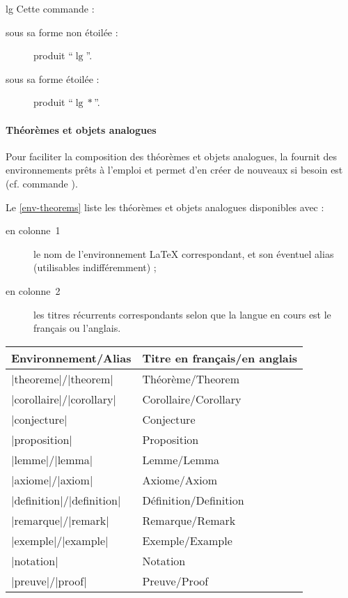 \begin{docCommand}{lg}{}
  Cette commande :
  \begin{description}
  \item[sous sa forme non étoilée :] produit \enquote{$\lg$}.
  \item[sous sa forme étoilée :] produit \enquote{$\lg*$}.
  \end{description}
\end{docCommand}

\paragraph{Théorèmes et objets analogues}

Pour faciliter la composition des théorèmes et objets analogues, la
\gztauthorcl{} fournit des environnements prêts à l'emploi et permet d'en créer
de nouveaux si besoin est (cf. commande ).

Le \vref{env-theorems} liste les théorèmes et objets analogues disponibles
%
avec :
\begin{description}
\item[en colonne~1] le nom de l'environnement \LaTeX{} correspondant, et son
  éventuel alias (utilisables indifféremment) ;
\item[en colonne~2] les titres récurrents correspondants selon que la langue en
  cours est le français ou l'anglais.
\end{description}

\begin{gzttable}[label=env-theorems,title=Environnements de type \enquote{théorème} fournis]
  \begin{tabular}{ll}
    Environnement/Alias       & Titre en français/en anglais \\\toprule
    |theoreme|/|theorem|      & Théorème/Theorem          \\\midrule
    |corollaire|/|corollary|  & Corollaire/Corollary      \\\midrule
    |conjecture|              & Conjecture                \\\midrule
    |proposition|             & Proposition               \\\midrule
    |lemme|/|lemma|           & Lemme/Lemma               \\\midrule
    |axiome|/|axiom|          & Axiome/Axiom              \\\midrule[.75pt]
    |definition|/|definition| & Définition/Definition     \\\midrule
    |remarque|/|remark|       & Remarque/Remark           \\\midrule
    |exemple|/|example|       & Exemple/Example           \\\midrule
    |notation|                & Notation                  \\\midrule[.75pt]
    |preuve|/|proof|          & Preuve/Proof              \\\bottomrule
  \end{tabular}
\end{gzttable}

